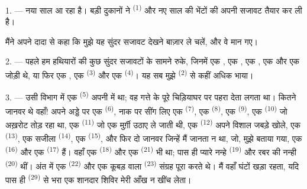 %

\VUsaut{4.0mm}
\VUsaut{2.0mm}
\VUsaut{3.4mm}

1. --- नया साल आ रहा है। बड़ी दुकानों ने  \textsuperscript{(1)} और
नए साल की भेंटों की अपनी सजावट तैयार कर ली है।

मैंने अपने दादा से कहा कि मुझे यह सुंदर सजावट देखने बाज़ार ले चलें, और वे मान गए।

2. --- पहले हम हथियारों की कुछ सुंदर सजावटों के सामने रुके, जिनमें एक
, एक , एक , एक
 और एक जोड़ी  थे, या फिर एक
, एक  \textsuperscript{(3)} और एक
 \textsuperscript{(4)}। यह सब मुझे 
\textsuperscript{(2)} से कहीं अधिक भाया।

\VUsaut{3.0mm}
\VUsaut{2.6mm}

3. --- उसी विभाग में एक  \textsuperscript{(5)} अपनी
 में था; वह गत्ते के पूरे चिड़ियाघर पर पहरा देता लगता था।
कितने जानवर थे वहाँ! अपने अड्डे पर एक  \textsuperscript{(6)}, नाक पर
सींग लिए एक  \textsuperscript{(7)}, एक 
\textsuperscript{(8)}, एक  \textsuperscript{(9)}, एक
 \textsuperscript{(10)} जो अख़रोट तोड़ रहा था, एक 
\textsuperscript{(11)} जो एक मुर्ग़ी उठाए ले जाती थी, एक 
\textsuperscript{(12)} अपने विशाल जबड़े खोले, एक  \textsuperscript{(13)},
एक सजीला  \textsuperscript{(14)}, एक 
\textsuperscript{(15)}, और फिर दो जानवर जिन्हें मैं जानता न था, जो, मुझे बताया गया,
एक  \textsuperscript{(16)} और एक 
\textsuperscript{(17)} हैं। वहाँ एक  \textsuperscript{(18)} और एक
 \textsuperscript{(21)} भी था; पास ही प्यारे नन्हे 
\textsuperscript{(19)} और रबर की नन्ही  \textsuperscript{(20)} थीं।
अंत में एक  \textsuperscript{(22)} और एक कूबड़ वाला
 \textsuperscript{(23)} संग्रह पूरा करते थे। मैं वहाँ घंटों खड़ा रहता,
यदि पास ही  \textsuperscript{(29)} से भरा एक शानदार
शिविर मेरी आँख न खींच लेता।

